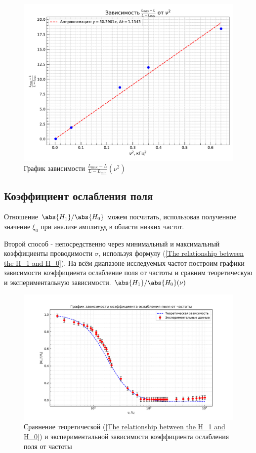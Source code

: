 \documentclass[a4paper, 12pt]{article} %
\begin{document}
	\begin{figure}[h!]
		\centering
		\includegraphics[width=\textwidth]{L(nu^2).pdf}
		\caption{График зависимости $\frac{L_{\max} - L}{L - L_{\min}} (\nu^2)$}
	\end{figure}
	
	
	\subsection{Коэффициент ослабления поля}
	Отношение $\abs{H_1}/\abs{H_0}$ можем посчитать, использовав полученное значение $\xi_0$ при анализе амплитуд в области низких частот.
    
	Второй способ - непосредственно через минимальный и максимальный коэффициенты проводимости $\sigma$, используя формулу (\ref{The relationship between the H_1 and H_0}). На всём диапазоне исследуемых частот построим графики зависимости коэффициента ослабление поля от частоты и сравним теоретическую и экспериментальную зависимости.
	$\abs{H_1}/\abs{H_0} (\nu)$
	
	\begin{figure}[h!]
		\centering
		\includegraphics[width=\textwidth]{Field attenuation coeff.pdf}
		\caption{Сравнение теоретической (\ref{The relationship between the H_1 and H_0}) и экспериментальной зависимости коэффициента ослабления поля от частоты}
        \label{field parametr decrease}
	\end{figure}
\end{document}
